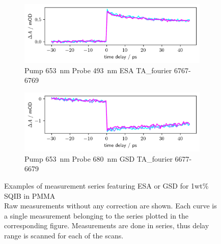 \documentclass[twoside,openright]{scrreprt}
\begin{document}
\begin{figure}[hbtp]
\centering
\begin{subfigure}[t]{\textwidth}
\centering
\includegraphics[scale=1]{images/TA_delayscan_493RAW.png}
\caption{Pump \SI{653}{\nano\meter} Probe \SI{493}{\nano\meter} ESA TA\_fourier 6767-6769}
\end{subfigure}
\begin{subfigure}[t]{\textwidth}
\centering
\includegraphics[scale=1]{images/TA_delayscan_680RAW.png}
\caption{Pump \SI{653}{\nano\meter} Probe \SI{680}{\nano\meter} GSD TA\_fourier 6677-6679}
\end{subfigure}
\caption{Examples of measurement series featuring ESA or GSD for 1wt\% SQIB in PMMA\\ Raw measurements without any correction are shown. Each curve is a single measurement belonging to the series plotted in the corresponding figure. Measurements are done in series, thus delay range is scanned for each of the scans.}
\end{figure}
\end{document}
